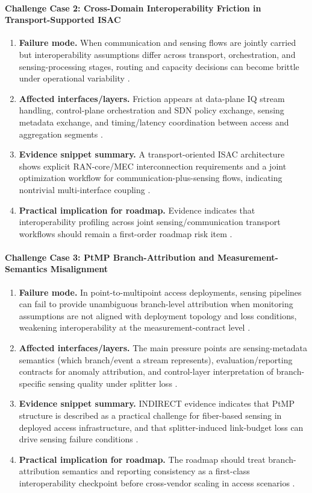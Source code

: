 \paragraph{Challenge Case 2: Cross-Domain Interoperability Friction in Transport-Supported ISAC}
\begin{enumerate}
    \item \textbf{Failure mode.} When communication and sensing flows are jointly carried but interoperability assumptions differ across transport, orchestration, and sensing-processing stages, routing and capacity decisions can become brittle under operational variability \cite{O_ISAC_025}.
    \item \textbf{Affected interfaces/layers.} Friction appears at data-plane IQ stream handling, control-plane orchestration and SDN policy exchange, sensing metadata exchange, and timing/latency coordination between access and aggregation segments \cite{O_ISAC_025}.
    \item \textbf{Evidence snippet summary.} A transport-oriented ISAC architecture shows explicit RAN-core/MEC interconnection requirements and a joint optimization workflow for communication-plus-sensing flows, indicating nontrivial multi-interface coupling \cite{O_ISAC_025}.
    \item \textbf{Practical implication for roadmap.} Evidence indicates that interoperability profiling across joint sensing/communication transport workflows should remain a first-order roadmap risk item \cite{O_ISAC_025}.
\end{enumerate}

\paragraph{Challenge Case 3: PtMP Branch-Attribution and Measurement-Semantics Misalignment}
\begin{enumerate}
    \item \textbf{Failure mode.} In point-to-multipoint access deployments, sensing pipelines can fail to provide unambiguous branch-level attribution when monitoring assumptions are not aligned with deployment topology and loss conditions, weakening interoperability at the measurement-contract level \cite{O_ISAC_104}.
    \item \textbf{Affected interfaces/layers.} The main pressure points are sensing-metadata semantics (which branch/event a stream represents), evaluation/reporting contracts for anomaly attribution, and control-layer interpretation of branch-specific sensing quality under splitter loss \cite{O_ISAC_104}.
    \item \textbf{Evidence snippet summary.} INDIRECT evidence indicates that PtMP structure is described as a practical challenge for fiber-based sensing in deployed access infrastructure, and that splitter-induced link-budget loss can drive sensing failure conditions \cite{O_ISAC_104}.
    \item \textbf{Practical implication for roadmap.} The roadmap should treat branch-attribution semantics and reporting consistency as a first-class interoperability checkpoint before cross-vendor scaling in access scenarios \cite{O_ISAC_104}.
\end{enumerate}

